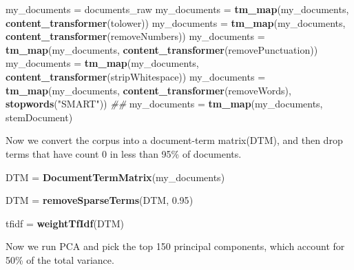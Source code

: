 \documentclass[]{article}
\newenvironment{Shaded}{\begin{snugshade}}{\end{snugshade}}
\newcommand{\CommentTok}[1]{\textcolor[rgb]{0.56,0.35,0.01}{\textit{#1}}}
\newcommand{\DataTypeTok}[1]{\textcolor[rgb]{0.13,0.29,0.53}{#1}}
\newcommand{\DecValTok}[1]{\textcolor[rgb]{0.00,0.00,0.81}{#1}}
\newcommand{\FloatTok}[1]{\textcolor[rgb]{0.00,0.00,0.81}{#1}}
\newcommand{\KeywordTok}[1]{\textcolor[rgb]{0.13,0.29,0.53}{\textbf{#1}}}
\newcommand{\NormalTok}[1]{#1}
\newcommand{\OperatorTok}[1]{\textcolor[rgb]{0.81,0.36,0.00}{\textbf{#1}}}
\newcommand{\OtherTok}[1]{\textcolor[rgb]{0.56,0.35,0.01}{#1}}
\newcommand{\StringTok}[1]{\textcolor[rgb]{0.31,0.60,0.02}{#1}}
\begin{document}
\begin{Shaded}
\begin{Highlighting}[]
\NormalTok{my_documents =}\StringTok{ }\NormalTok{documents_raw}
\NormalTok{my_documents =}\StringTok{ }\KeywordTok{tm_map}\NormalTok{(my_documents, }\KeywordTok{content_transformer}\NormalTok{(tolower)) }
\NormalTok{my_documents =}\StringTok{ }\KeywordTok{tm_map}\NormalTok{(my_documents, }\KeywordTok{content_transformer}\NormalTok{(removeNumbers)) }
\NormalTok{my_documents =}\StringTok{ }\KeywordTok{tm_map}\NormalTok{(my_documents, }\KeywordTok{content_transformer}\NormalTok{(removePunctuation)) }
\NormalTok{my_documents =}\StringTok{ }\KeywordTok{tm_map}\NormalTok{(my_documents, }\KeywordTok{content_transformer}\NormalTok{(stripWhitespace))}
\NormalTok{my_documents =}\StringTok{ }\KeywordTok{tm_map}\NormalTok{(my_documents, }\KeywordTok{content_transformer}\NormalTok{(removeWords), }\KeywordTok{stopwords}\NormalTok{(}\StringTok{"SMART"}\NormalTok{)) }\CommentTok{##}
\NormalTok{my_documents =}\StringTok{ }\KeywordTok{tm_map}\NormalTok{(my_documents, stemDocument)}
\end{Highlighting}
\end{Shaded}

Now we convert the corpus into a document-term matrix(DTM), and then
drop terms that have count 0 in less than 95\% of documents.

\begin{Shaded}
\begin{Highlighting}[]
\NormalTok{DTM =}\StringTok{ }\KeywordTok{DocumentTermMatrix}\NormalTok{(my_documents)}

\NormalTok{DTM =}\StringTok{ }\KeywordTok{removeSparseTerms}\NormalTok{(DTM, }\FloatTok{0.95}\NormalTok{)}

\NormalTok{tfidf =}\StringTok{ }\KeywordTok{weightTfIdf}\NormalTok{(DTM)}
\end{Highlighting}
\end{Shaded}

Now we run PCA and pick the top 150 principal components, which account
for 50\% of the total variance.

\begin{Shaded}
\end{Shaded}
\end{document}
